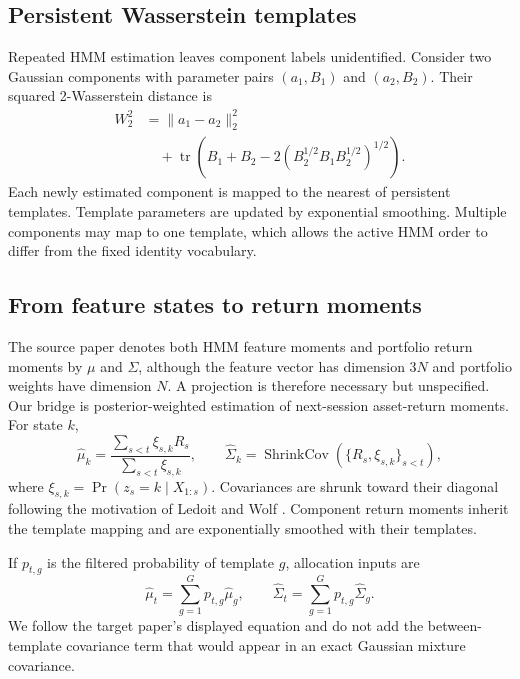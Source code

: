 \documentclass[11pt]{article}
\begin{document}
\subsection{Persistent Wasserstein templates}

Repeated HMM estimation leaves component labels unidentified. Consider two Gaussian components with parameter pairs \((a_1,B_1)\) and \((a_2,B_2)\). Their squared 2-Wasserstein distance is
\begin{equation}
\begin{split}
 W_2^2 &= \|a_1-a_2\|_2^2 \\
 &\quad + \operatorname{tr}\!\left(B_1+B_2-2\left(B_2^{1/2}B_1B_2^{1/2}\right)^{1/2}\right).
\end{split}
\label{eq:wasserstein}
\end{equation}
Each newly estimated component is mapped to the nearest of \TemplateCount{} persistent templates. Template parameters are updated by exponential smoothing. Multiple components may map to one template, which allows the active HMM order to differ from the fixed identity vocabulary.

\subsection{From feature states to return moments}

The source paper denotes both HMM feature moments and portfolio return moments by \(\mu\) and \(\Sigma\), although the feature vector has dimension \(3N\) and portfolio weights have dimension \(N\). A projection is therefore necessary but unspecified. Our bridge is posterior-weighted estimation of next-session asset-return moments. For state \(k\),
\begin{equation}
  \widehat\mu_k=\frac{\sum_{s<t}\xi_{s,k}R_s}{\sum_{s<t}\xi_{s,k}},
  \qquad
  \widehat\Sigma_k=\operatorname{ShrinkCov}\!\left(\{R_s,\xi_{s,k}\}_{s<t}\right),
  \label{eq:returnmoments}
\end{equation}
where \(\xi_{s,k}=\Pr(z_s=k\mid X_{1:s})\). Covariances are shrunk toward their diagonal following the motivation of Ledoit and Wolf \cite{ledoitwolf2004}. Component return moments inherit the template mapping and are exponentially smoothed with their templates.

If \(p_{t,g}\) is the filtered probability of template \(g\), allocation inputs are
\begin{equation}
  \widehat\mu_t=\sum_{g=1}^{G}p_{t,g}\widehat\mu_g,
  \qquad
  \widehat\Sigma_t=\sum_{g=1}^{G}p_{t,g}\widehat\Sigma_g.
  \label{eq:mixture}
\end{equation}
We follow the target paper's displayed equation and do not add the between-template covariance term that would appear in an exact Gaussian mixture covariance.
\end{document}
